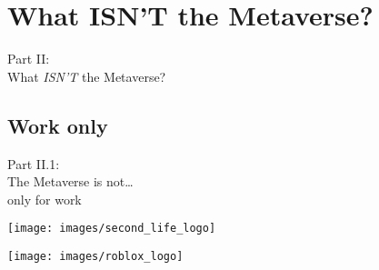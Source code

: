 \documentclass[aspectratio=169,x11names]{beamer}
\begin{document}
\section{What ISN'T the Metaverse?}

\begin{frame}
\begin{center}
\Large
Part II:\bigskip\\
\huge
What \emph{ISN'T} the Metaverse?
\end{center}
\end{frame}

\subsection{Work only}

\begin{frame}
\begin{center}
\Large
Part II.1:\bigskip\\
\huge
The Metaverse is not\dots\\ only for work
\end{center}
\end{frame}


\begin{frame}
\begin{minipage}{0.45\textwidth}
\begin{center}
\texttt{[image: images/second\_life\_logo]} 
\end{center}
\end{minipage}%
\begin{minipage}{0.55\textwidth}
\begin{center}
\end{center}
\end{minipage}
\end{frame}

\begin{frame}
\begin{minipage}{0.45\textwidth}
\begin{center}
\texttt{[image: images/roblox\_logo]} 
\end{center}
\end{minipage}%
\begin{minipage}{0.55\textwidth}
\begin{center}
\end{center}
\end{minipage}
\end{frame}
\end{document}
